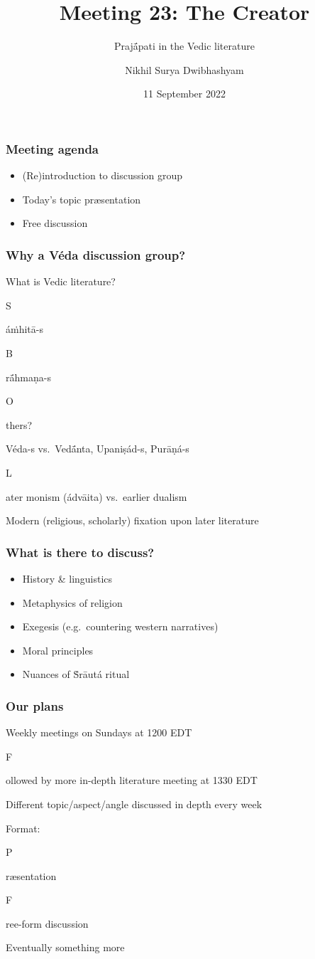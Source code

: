\documentclass[pdf]{beamer}
\title{Meeting 23: The Creator}
\subtitle{Prajā́pati in the Vedic literature}
\author{Nikhil Surya Dwibhashyam}
\date{11 September 2022}
\newcommand{\Subitem}[1]{{\setlength\itemindent{12pt} \item[-] #1}}
\begin{document}
\frame{\titlepage}

\begin{frame} \frametitle{Meeting agenda}
\begin{itemize}
	\item (Re)introduction to discussion group
	\item Today's topic præsentation
	\item Free discussion
\end{itemize}
\end{frame}

\begin{frame} \frametitle{Why a Véda discussion group?}
\begin{itemize}
	\item What is Vedic literature?
	\Subitem Sáṁhitā-s
	\Subitem Brā́hmaṇa-s
	\Subitem Others?
	\item Véda-s vs.~Vedā́nta,  Upaniṣád-s, Purāṇá-s
	\Subitem Later monism (ádvāita) vs.~earlier dualism
	\item Modern (religious, scholarly) fixation upon later literature
\end{itemize}
\end{frame}

\begin{frame} \frametitle{What is there to discuss?}
\begin{itemize}
	\item History \& linguistics
	\item Metaphysics of religion
	\item Exegesis (e.g.~countering western narratives)
	\item Moral principles
	\item Nuances of Ṡrāutá ritual
\end{itemize}
\end{frame}

\begin{frame} \frametitle{Our plans}
\begin{itemize}
	\item Weekly meetings on Sundays at 1200 EDT
	\Subitem Followed by more in-depth literature meeting at 1330 EDT
	\item Different topic/aspect/angle discussed in depth every week
	\item Format:
	\Subitem Præsentation
	\Subitem Free-form discussion
	\item Eventually something more
\end{itemize}
\end{frame}
\end{document}

